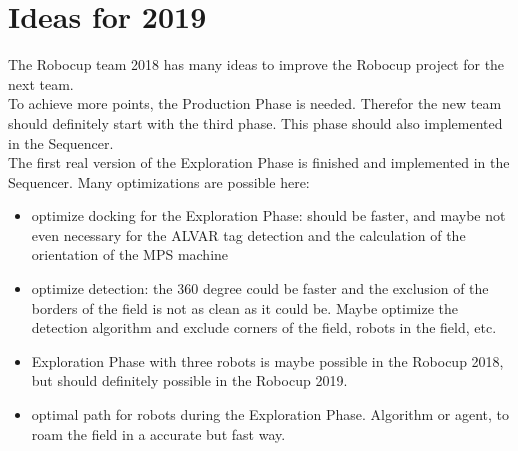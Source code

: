 \section{Ideas for 2019}

The Robocup team 2018 has many ideas to improve the Robocup project for the next team.\\

To achieve more points, the Production Phase is needed. Therefor the new team should definitely start with the third phase. This phase should also implemented in the Sequencer. \\

The first real version of the Exploration Phase is finished and implemented in the Sequencer. Many optimizations are possible here:
\begin{itemize} 
\item optimize docking for the Exploration Phase: should be faster, and maybe not even necessary for the ALVAR tag detection and the calculation of the orientation of the MPS machine
\item optimize detection: the 360 degree could be faster and the exclusion of the borders of the field is not as clean as it could be. Maybe optimize the detection algorithm and exclude corners of the field, robots in the field, etc.
\item Exploration Phase with three robots is maybe possible in the Robocup 2018, but should definitely possible in the Robocup 2019.
\item optimal path for robots during the Exploration Phase. Algorithm or agent, to roam the field in a accurate but fast way.
\end{itemize}
 
